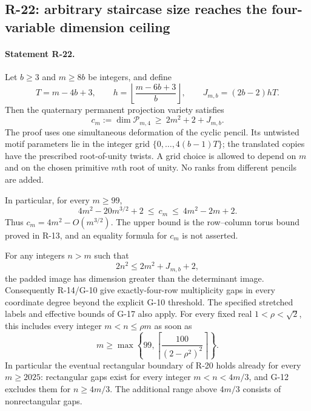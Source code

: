 \subsection{R-22: arbitrary staircase size reaches the four-variable dimension ceiling}

\paragraph{Statement R-22.}
Let $b\geq3$ and $m\geq8b$ be integers, and define
\[
 T=m-4b+3,\qquad h=\left\lfloor\frac{m-6b+3}{b}\right\rfloor,
 \qquad J_{m,b}=(2b-2)hT.
\]
Then the quaternary permanent projection variety satisfies
\begin{equation}\label{R22:rank}
 c_m:=\dim\mathcal P_{m,4}\ \geq\ 2m^2+2+J_{m,b}.
\end{equation}
The proof uses one simultaneous deformation of the cyclic pencil.
Its untwisted motif parameters lie in the integer grid
$\{0,\ldots,4(b-1)T\}$; the translated copies have the prescribed
root-of-unity twists. A grid choice is allowed to depend on $m$ and on
the chosen primitive $m$th root of unity. No ranks from
different pencils are added.

In particular, for every $m\geq99$,
\begin{equation}\label{R22:asymptotic}
 4m^2-20m^{3/2}+2\ \leq\ c_m\ \leq\ 4m^2-2m+2.
\end{equation}
Thus $c_m=4m^2-O(m^{3/2})$. The upper bound is the row--column torus
bound proved in R-13, and an equality formula for $c_m$ is not asserted.

For any integers $n>m$ such that
\begin{equation}\label{R22:padding}
 2n^2\leq2m^2+J_{m,b}+2,
\end{equation}
the padded image has dimension greater than the determinant image.
Consequently R-14/G-10 give exactly-four-row multiplicity gaps in every
coordinate degree beyond the explicit G-10 threshold. The specified
stretched labels and effective bounds of G-17 also apply.
For every fixed real $1<\rho<\sqrt2$, this includes every integer
$m<n\leq\rho m$ as soon as
\begin{equation}\label{R22:ratio_threshold}
 m\geq\max\left\{99,
       \left\lceil\frac{100}{(2-\rho^2)^2}\right\rceil\right\}.
\end{equation}
In particular the eventual rectangular boundary of R-20 holds already
for every $m\geq2025$: rectangular gaps exist for every integer
$m<n<4m/3$, and G-12 excludes them for $n\geq4m/3$.
The additional range above $4m/3$ consists of nonrectangular gaps.

